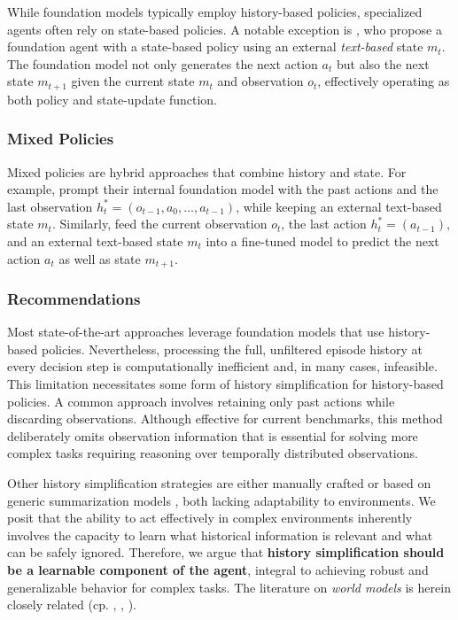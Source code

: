 While foundation models typically employ history-based policies, specialized agents often rely on state-based policies.
A notable exception is \citet{zhang_appagent_2023}, who propose a foundation agent with a state-based policy using an external \emph{text-based} state $m_t$. The foundation model not only generates the next action $a_t$ but also the next state $m_{t+1}$ given the current state $m_{t}$ and observation $o_t$, effectively operating as both policy and state-update function.

\subsubsection{Mixed Policies}\label{sec:agent_policy_mixed}
Mixed policies are hybrid approaches that combine history and state.
For example, \citet{bonatti_windows_2024} prompt their internal foundation model with the past actions and the last observation $h_t^*=\left(o_{t-1},a_0,\hdots, a_{t-1}\right)$, while keeping an external text-based state $m_t$.
Similarly, \citet{iki_berts_2022} feed the current observation $o_t$, the last action $h_t^*=\left(a_{t-1}\right)$, and an external text-based state $m_{t}$ into a fine-tuned model to predict the next action $a_t$ as well as state $m_{t+1}$.


\subsubsection{Recommendations}
Most state-of-the-art approaches leverage foundation models that use history-based policies.
Nevertheless, processing the full, unfiltered episode history at every decision step is computationally inefficient and, in many cases, infeasible. This limitation necessitates some form of history simplification for history-based policies. 
A common approach involves retaining only past actions while discarding observations. Although effective for current benchmarks, this method deliberately omits observation information that is essential for solving more complex tasks requiring reasoning over temporally distributed observations.

Other history simplification strategies are either manually crafted  or based on generic summarization models , both lacking adaptability to environments.
We posit that the ability to act effectively in complex environments inherently involves the capacity to learn what historical information is relevant and what can be safely ignored. Therefore, we argue that \textbf{history simplification should be a learnable component of the agent}, integral to achieving robust and generalizable behavior for complex tasks. The literature on \emph{world models} is herein closely related (cp. \citet{ha2018world}, \citet{lecun_path_2022}, \citet{hafner2025mastering}).

